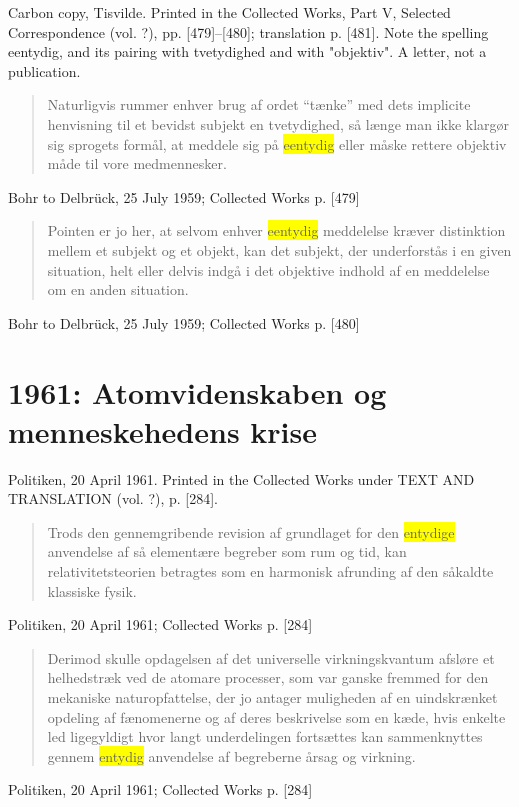 \documentclass[11pt]{article}
\newcommand{\dcite}[1]{{\nopagebreak\raggedleft\small #1\par}\medskip}
\newcommand{\tlg}[1]{{\setlength{\fboxsep}{0.8pt}\colorbox{yellow}{#1}}}
\begin{document}
\noindent Carbon copy, Tisvilde. Printed in the Collected Works, Part V, Selected Correspondence (vol. ?), pp. [479]–[480]; translation p. [481]. Note the spelling eentydig, and its pairing with tvetydighed and with "objektiv". A letter, not a publication.

\begin{quote}
Naturligvis rummer enhver brug af ordet “tænke” med dets implicite henvisning til et bevidst subjekt en tvetydighed, så længe man ikke klargør sig sprogets formål, at meddele sig på \tlg{eentydig} eller måske rettere objektiv måde til vore medmennesker.
\end{quote}
\dcite{Bohr to Delbrück, 25 July 1959; Collected Works p. [479]}

\begin{quote}
Pointen er jo her, at selvom enhver \tlg{eentydig} meddelelse kræver distinktion mellem et subjekt og et objekt, kan det subjekt, der underforstås i en given situation, helt eller delvis indgå i det objektive indhold af en meddelelse om en anden situation.
\end{quote}
\dcite{Bohr to Delbrück, 25 July 1959; Collected Works p. [480]}

\section{1961: Atomvidenskaben og menneskehedens krise}

\noindent Politiken, 20 April 1961. Printed in the Collected Works under TEXT AND TRANSLATION (vol. ?), p. [284].

\begin{quote}
Trods den gennemgribende revision af grundlaget for den \tlg{entydige} anvendelse af så elementære begreber som rum og tid, kan relativitetsteorien betragtes som en harmonisk afrunding af den såkaldte klassiske fysik.
\end{quote}
\dcite{Politiken, 20 April 1961; Collected Works p. [284]}

\begin{quote}
Derimod skulle opdagelsen af det universelle virkningskvantum afsløre et helhedstræk ved de atomare processer, som var ganske fremmed for den mekaniske naturopfattelse, der jo antager muligheden af en uindskrænket opdeling af fænomenerne og af deres beskrivelse som en kæde, hvis enkelte led ligegyldigt hvor langt underdelingen fortsættes kan sammenknyttes gennem \tlg{entydig} anvendelse af begreberne årsag og virkning.
\end{quote}
\dcite{Politiken, 20 April 1961; Collected Works p. [284]}
\end{document}
